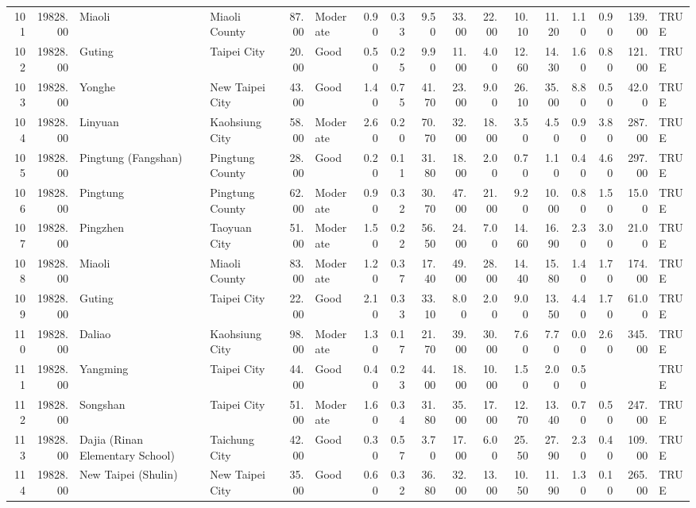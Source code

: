 \begin{table}[ht]
\begin{tabular}{rrllrlrrrrrrrrrrl}
  101 & 19828.00 & Miaoli & Miaoli County & 87.00 & Moderate & 0.90 & 0.33 & 9.50 & 33.00 & 22.00 & 10.10 & 11.20 & 1.10 & 0.90 & 139.00 & TRUE \\ 
  102 & 19828.00 & Guting & Taipei City & 20.00 & Good & 0.50 & 0.25 & 9.90 & 11.00 & 4.00 & 12.60 & 14.30 & 1.60 & 0.80 & 121.00 & TRUE \\ 
  103 & 19828.00 & Yonghe & New Taipei City & 43.00 & Good & 1.40 & 0.75 & 41.70 & 23.00 & 9.00 & 26.10 & 35.00 & 8.80 & 0.50 & 42.00 & TRUE \\ 
  104 & 19828.00 & Linyuan & Kaohsiung City & 58.00 & Moderate & 2.60 & 0.20 & 70.70 & 32.00 & 18.00 & 3.50 & 4.50 & 0.90 & 3.80 & 287.00 & TRUE \\ 
  105 & 19828.00 & Pingtung (Fangshan) & Pingtung County & 28.00 & Good & 0.20 & 0.11 & 31.80 & 18.00 & 2.00 & 0.70 & 1.10 & 0.40 & 4.60 & 297.00 & TRUE \\ 
  106 & 19828.00 & Pingtung & Pingtung County & 62.00 & Moderate & 0.90 & 0.32 & 30.70 & 47.00 & 21.00 & 9.20 & 10.00 & 0.80 & 1.50 & 15.00 & TRUE \\ 
  107 & 19828.00 & Pingzhen & Taoyuan City & 51.00 & Moderate & 1.50 & 0.22 & 56.50 & 24.00 & 7.00 & 14.60 & 16.90 & 2.30 & 3.00 & 21.00 & TRUE \\ 
  108 & 19828.00 & Miaoli & Miaoli County & 83.00 & Moderate & 1.20 & 0.37 & 17.40 & 49.00 & 28.00 & 14.40 & 15.80 & 1.40 & 1.70 & 174.00 & TRUE \\ 
  109 & 19828.00 & Guting & Taipei City & 22.00 & Good & 2.10 & 0.33 & 33.10 & 8.00 & 2.00 & 9.00 & 13.50 & 4.40 & 1.70 & 61.00 & TRUE \\ 
  110 & 19828.00 & Daliao & Kaohsiung City & 98.00 & Moderate & 1.30 & 0.17 & 21.70 & 39.00 & 30.00 & 7.60 & 7.70 & 0.00 & 2.60 & 345.00 & TRUE \\ 
  111 & 19828.00 & Yangming & Taipei City & 44.00 & Good & 0.40 & 0.23 & 44.00 & 18.00 & 10.00 & 1.50 & 2.00 & 0.50 &  &  & TRUE \\ 
  112 & 19828.00 & Songshan & Taipei City & 51.00 & Moderate & 1.60 & 0.34 & 31.80 & 35.00 & 17.00 & 12.70 & 13.40 & 0.70 & 0.50 & 247.00 & TRUE \\ 
  113 & 19828.00 & Dajia (Rinan Elementary School) & Taichung City & 42.00 & Good & 0.30 & 0.57 & 3.70 & 17.00 & 6.00 & 25.50 & 27.90 & 2.30 & 0.40 & 109.00 & TRUE \\ 
  114 & 19828.00 & New Taipei (Shulin) & New Taipei City & 35.00 & Good & 0.60 & 0.32 & 36.80 & 32.00 & 13.00 & 10.50 & 11.90 & 1.30 & 0.10 & 265.00 & TRUE \\ 

\end{tabular}
\end{table}
